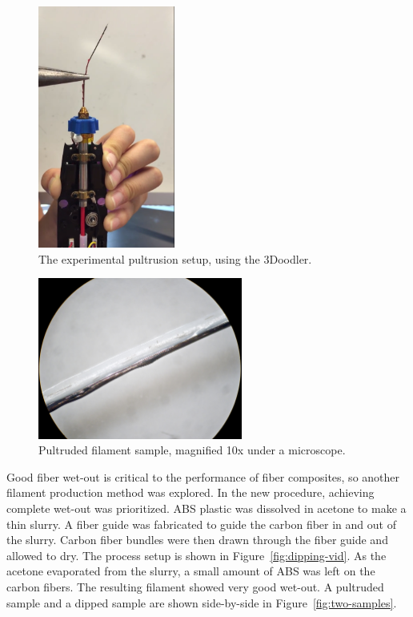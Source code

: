 \begin{figure}[htp]
    \centering
    \includegraphics[width=0.4\textwidth]{./figures/pultrusion-vid}
    \caption{The experimental pultrusion setup, using the 3Doodler.}
    \label{fig:pultrusion-vid}
\end{figure}

\begin{figure}[htp]
    \centering
    \includegraphics[width=0.6\textwidth]{./figures/pultruded-scope}
    \caption{Pultruded filament sample, magnified 10x under a microscope.}
    \label{fig:pultruded-scope}
\end{figure}

Good fiber wet-out is critical to the performance of fiber composites, so another filament production method was explored. In the new procedure, achieving complete wet-out was prioritized. ABS plastic was dissolved in acetone to make a thin slurry. A fiber guide was fabricated to guide the carbon fiber in and out of the slurry. Carbon fiber bundles were then drawn through the fiber guide and allowed to dry. The process setup is shown in Figure~\ref{fig:dipping-vid}. As the acetone evaporated from the slurry, a small amount of ABS was left on the carbon fibers. The resulting filament showed very good wet-out. A pultruded sample and a dipped sample are shown side-by-side in Figure~\ref{fig:two-samples}.\\

